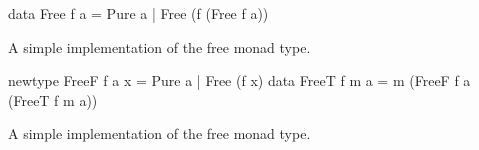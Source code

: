   \begin{code}
\begin{haskellcode}
data Free f a
  = Pure a
  | Free (f (Free f a))
\end{haskellcode}
    \caption{\label{lst:free_def_naive}A simple implementation of the free
      monad type.}
  \end{code}

  \begin{code}
\begin{haskellcode}
newtype FreeF f a x = Pure a | Free (f x)
data FreeT f m a = m (FreeF f a (FreeT f m a))
\end{haskellcode}
    \caption{\label{lst:free_def}A simple implementation of the free
      monad type.}
  \end{code}
  
